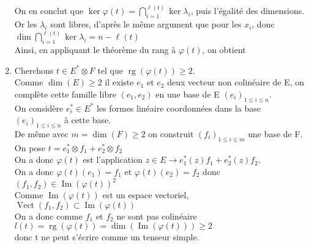 \documentclass{article}
\DeclareMathOperator{\rg}{\mathrm{rg}}
\DeclareMathOperator{\Img}{\mathrm{Im}}
\DeclareMathOperator{\Vect}{\mathrm{Vect}}
\def \r {{\ell(t)}}
\begin{document}
\begin{enumerate}[1., start=1]
        \par \setlength{\leftskip}{0cm}
        On en conclut que $\displaystyle\ker \varphi(t) = \bigcap_{i=1}^\r\ker\lambda_i$, puis l'égalité des dimensions.\\
        Or les $\lambda_i$ sont libres, d'après le même argument que pour les $x_i$, donc $\displaystyle \dim\bigcap_{i=1}^\r\ker\lambda_i = n-\r$\\
        Ainsi, en appliquant le théorème du rang à $\varphi(t)$, on obtient
        \boxed{\rg\varphi(t) = \r}
    \item
    Cherchons $t\in E^* \otimes F$ tel que $\rg(\varphi(t))\geq 2$. \\
    Comme $\dim(E)\geq 2$ il existe $e_1$ et $e_2$ deux vecteur non colinéaire de E, on complète cette famille libre $(e_1,e_2)$ en une base de E $(e_i)_{1\leq i \leq n}$.  \\
    On considère $e^*_i \in E^*$ les formes linéaire coordonnées dans la base $(e_i)_{1 \leq i \leq n}$ à cette base. \\
    De même avec $m=\dim(F) \geq 2$ on construit $(f_i)_{1\leq i \leq m}$ une base de F. \\
    On pose $t=e^*_1 \otimes f_1 + e^*_2 \otimes f_2$ \\
    On a donc $\varphi(t)$ est l'application $z \in E \rightarrow e^*_1(z) f_1 + e^*_2(z) f_2$. \\
    On a donc $\varphi(t)(e_1)=f_1$ et $\varphi(t)(e_2)=f_2$ donc $(f_1,f_2) \in \Img(\varphi(t))^2$ \\
    Comme $\Img(\varphi(t))$ est un espace vectoriel, $\Vect(f_1,f_2) \subset \Img(\varphi(t))$ \\
    On a donc comme $f_1$ et $f_2$ ne sont pas colinéaire $l(t)=\rg(\varphi(t))=\dim(\Img(\varphi(t))) \geq 2$ \\
    donc t ne peut s'écrire comme un tenseur simple.

\end{enumerate}
\end{document}
